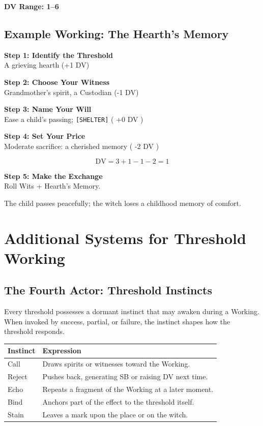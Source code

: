 \documentclass[11pt]{book}
\begin{document}
\textbf{DV Range: 1--6}

\subsection*{Example Working: The Hearth's Memory}

\textbf{Step 1: Identify the Threshold} \\
A grieving hearth (+1 DV)

\textbf{Step 2: Choose Your Witness} \\
Grandmother's spirit, a Custodian (-1 DV)

\textbf{Step 3: Name Your Will} \\
Ease a child's passing; \texttt{[SHELTER]} ( +0 DV )

\textbf{Step 4: Set Your Price} \\
Moderate sacrifice: a cherished memory ( -2 DV )

\[
\text{DV} = 3 +1 -1 -2 = 1
\]

\textbf{Step 5: Make the Exchange} \\
Roll Wits + Hearth's Memory.

The child passes peacefully; the witch loses a childhood memory of comfort.

\section*{Additional Systems for Threshold Working}

\subsection*{The Fourth Actor: Threshold Instincts}

Every threshold possesses a dormant instinct that may awaken during a Working.  
When invoked by success, partial, or failure, the instinct shapes how the threshold responds.

\begin{center}
\begin{longtable}{p{} p{}}
\toprule
\textbf{Instinct} & \textbf{Expression} \\
\midrule
Call   & Draws spirits or witnesses toward the Working. \\
Reject & Pushes back, generating SB or raising DV next time. \\
Echo   & Repeats a fragment of the Working at a later moment. \\
Bind   & Anchors part of the effect to the threshold itself. \\
Stain  & Leaves a mark upon the place or on the witch. \\
\bottomrule
\end{longtable}
\end{center}
\end{document}
